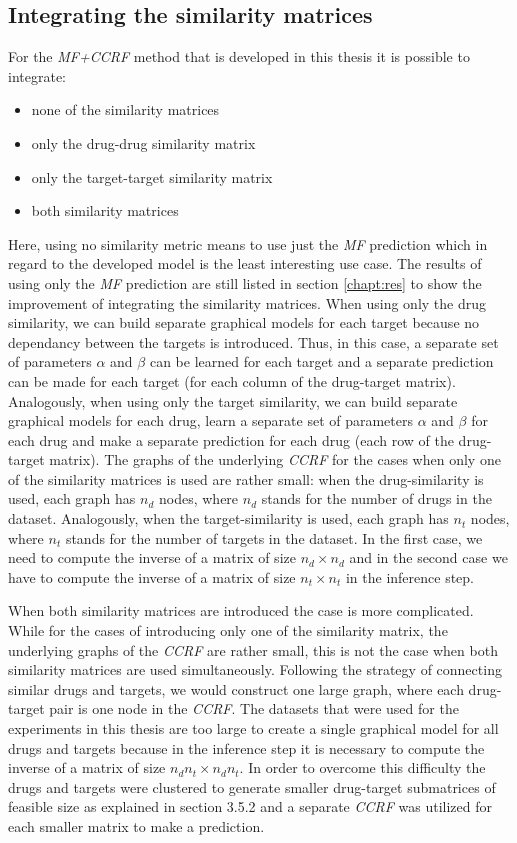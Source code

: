 \subsection{Integrating the similarity matrices}
For the \textit{MF+CCRF} method that is developed in this thesis it is possible to integrate:
\begin{itemize}
\item none of the similarity matrices
\item only the drug-drug similarity matrix
\item only the target-target similarity matrix
\item both similarity matrices
\end{itemize}
Here, using no similarity metric means to use just the \textit{MF} prediction which in regard to the developed model is the least interesting use case. The results of using only the \textit{MF} prediction are still listed in section \ref{chapt:res} to show the improvement of integrating the similarity matrices. When using only the drug similarity, we can build separate graphical models for each target because no dependancy between the targets is introduced. Thus, in this case, a separate set of parameters $\alpha$ and $\beta$ can be learned for each target and a separate prediction can be made for each target (for each column of the drug-target matrix). Analogously, when using only the target similarity, we can build separate graphical models for each drug, learn a separate set of parameters $\alpha$ and $\beta$ for each drug and make a separate prediction for each drug (each row of the drug-target matrix). The graphs of the underlying \textit{CCRF} for the cases when only one of the similarity matrices is used are rather small: when the drug-similarity is used, each graph has $n_d$ nodes, where $n_d$ stands for the number of drugs in the dataset. Analogously, when the target-similarity is used, each graph has $n_t$ nodes, where $n_t$ stands for the number of targets in the dataset. In the first case, we need to compute the inverse of a matrix of size $n_d \times n_d$ and in the second case we have to compute the inverse of a matrix of size $n_t \times n_t$ in the inference step.

When both similarity matrices are introduced the case is more complicated. While for the cases of introducing only one of the similarity matrix, the underlying graphs of the \textit{CCRF} are rather small, this is not the case when both similarity matrices are used simultaneously. Following the strategy of connecting similar drugs and targets, we would construct one large graph, where each drug-target pair is one node in the \textit{CCRF}. The datasets that were used for the experiments in this thesis are too large to create a single graphical model for all drugs and targets because in the inference step it is necessary to compute the inverse of a matrix of size $n_dn_t \times n_dn_t$. In order to overcome this difficulty the drugs and targets were clustered to generate smaller drug-target submatrices of feasible size as explained in section 3.5.2 and a separate \textit{CCRF} was utilized for each smaller matrix to make a prediction.


